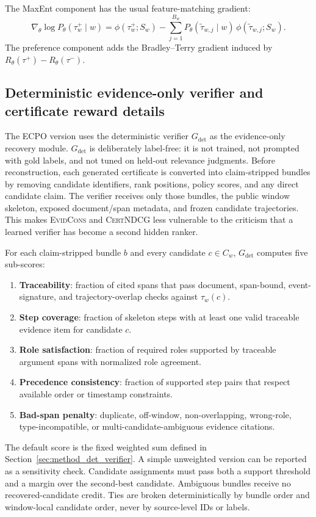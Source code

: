 \documentclass{article}
\newcommand{\CertNDCG}{\textsc{CertNDCG}}
\newcommand{\EvidCons}{\textsc{EvidCons}}
\newcommand{\Gdet}{G_{\mathrm{det}}}
\begin{document}
The MaxEnt component has the usual feature-matching gradient:
\begin{equation}
\nabla_\theta \log P_\theta(\tau_w^+ \mid w)
=
\phi(\tau_w^+;S_w)
-
\sum_{j=1}^{B_w}
P_\theta(\tilde{\tau}_{w,j}\mid w)\,
\phi(\tilde{\tau}_{w,j};S_w).
\end{equation}
The preference component adds the Bradley--Terry gradient induced by
$R_\theta(\tau^+)-R_\theta(\tau^-)$.

\subsection{Deterministic evidence-only verifier and certificate reward details}
\label{sec:app_evidence_verifier}
The ECPO version uses the deterministic verifier $\Gdet$ as the evidence-only recovery module. $\Gdet$ is deliberately label-free: it is not trained, not prompted with gold labels, and not tuned on held-out relevance judgments. Before reconstruction, each generated certificate is converted into claim-stripped bundles by removing candidate identifiers, rank positions, policy scores, and any direct candidate claim. The verifier receives only those bundles, the public window skeleton, exposed document/span metadata, and frozen candidate trajectories. This makes \EvidCons{} and \CertNDCG{} less vulnerable to the criticism that a learned verifier has become a second hidden ranker.

For each claim-stripped bundle $b$ and every candidate $c\in C_w$, $\Gdet$ computes five sub-scores:
\begin{enumerate}
    \item \textbf{Traceability}: fraction of cited spans that pass document, span-bound, event-signature, and trajectory-overlap checks against $\tau_w(c)$.
    \item \textbf{Step coverage}: fraction of skeleton steps with at least one valid traceable evidence item for candidate $c$.
    \item \textbf{Role satisfaction}: fraction of required roles supported by traceable argument spans with normalized role agreement.
    \item \textbf{Precedence consistency}: fraction of supported step pairs that respect available order or timestamp constraints.
    \item \textbf{Bad-span penalty}: duplicate, off-window, non-overlapping, wrong-role, type-incompatible, or multi-candidate-ambiguous evidence citations.
\end{enumerate}
The default score is the fixed weighted sum defined in Section~\ref{sec:method_det_verifier}. A simple unweighted version can be reported as a sensitivity check. Candidate assignments must pass both a support threshold and a margin over the second-best candidate. Ambiguous bundles receive no recovered-candidate credit. Ties are broken deterministically by bundle order and window-local candidate order, never by source-level IDs or labels.
\end{document}
